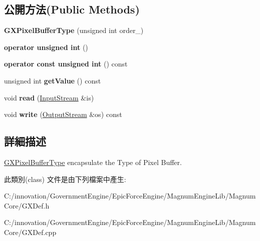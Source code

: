 \subsection*{公開方法(Public Methods)}
\begin{DoxyCompactItemize}
\item 
{\bfseries G\+X\+Pixel\+Buffer\+Type} (unsigned int order\+\_)\hypertarget{class_i_dream_sky_1_1_g_x_pixel_buffer_type_a955f1237d3887253360867576a779745}{}\label{class_i_dream_sky_1_1_g_x_pixel_buffer_type_a955f1237d3887253360867576a779745}

\item 
{\bfseries operator unsigned int} ()\hypertarget{class_i_dream_sky_1_1_g_x_pixel_buffer_type_aa83fb82bd0e2e782e07d4dd993713838}{}\label{class_i_dream_sky_1_1_g_x_pixel_buffer_type_aa83fb82bd0e2e782e07d4dd993713838}

\item 
{\bfseries operator const unsigned int} () const \hypertarget{class_i_dream_sky_1_1_g_x_pixel_buffer_type_abccdf4c1e6459184759237411c9f09d2}{}\label{class_i_dream_sky_1_1_g_x_pixel_buffer_type_abccdf4c1e6459184759237411c9f09d2}

\item 
unsigned int {\bfseries get\+Value} () const \hypertarget{class_i_dream_sky_1_1_g_x_pixel_buffer_type_a5984daeb25bb42bdf4e6cece50450c63}{}\label{class_i_dream_sky_1_1_g_x_pixel_buffer_type_a5984daeb25bb42bdf4e6cece50450c63}

\item 
void {\bfseries read} (\hyperlink{class_i_dream_sky_1_1_input_stream}{Input\+Stream} \&is)\hypertarget{class_i_dream_sky_1_1_g_x_pixel_buffer_type_a28fb70047c9f7749c37872f672a98b92}{}\label{class_i_dream_sky_1_1_g_x_pixel_buffer_type_a28fb70047c9f7749c37872f672a98b92}

\item 
void {\bfseries write} (\hyperlink{class_i_dream_sky_1_1_output_stream}{Output\+Stream} \&os) const \hypertarget{class_i_dream_sky_1_1_g_x_pixel_buffer_type_a5e5aaec22164570d25163fc907b44638}{}\label{class_i_dream_sky_1_1_g_x_pixel_buffer_type_a5e5aaec22164570d25163fc907b44638}

\end{DoxyCompactItemize}


\subsection{詳細描述}
\hyperlink{class_i_dream_sky_1_1_g_x_pixel_buffer_type}{G\+X\+Pixel\+Buffer\+Type} encapsulate the Type of Pixel Buffer. 

此類別(class) 文件是由下列檔案中產生\+:\begin{DoxyCompactItemize}
\item 
C\+:/innovation/\+Government\+Engine/\+Epic\+Force\+Engine/\+Magnum\+Engine\+Lib/\+Magnum\+Core/G\+X\+Def.\+h\item 
C\+:/innovation/\+Government\+Engine/\+Epic\+Force\+Engine/\+Magnum\+Engine\+Lib/\+Magnum\+Core/G\+X\+Def.\+cpp\end{DoxyCompactItemize}
